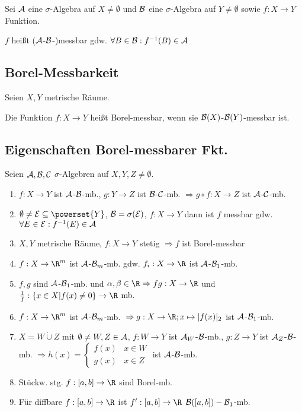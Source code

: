 Sei $\mathcal{A}$ eine $\sigma$-Algebra auf $X \neq \emptyset$ und $\mathcal{B}$ eine $\sigma$-Algebra auf $Y \neq \emptyset$ sowie $f : X \to Y$ Funktion.

$f$ heißt ($\mathcal{A}$-$\mathcal{B}$-)messbar gdw. $\forall B \in \mathcal{B} : f^{-1}(B) \in \mathcal{A}$

\subsection*{Borel-Messbarkeit}

Seien $X, Y$ metrische Räume.

Die Funktion $f : X \to Y$ heißt Borel-messbar, wenn sie $\mathcal{B}(X)$-$\mathcal{B}(Y)$-messbar ist.

\subsection*{Eigenschaften Borel-messbarer Fkt.}

Seien $\mathcal{A}, \mathcal{B}, \mathcal{C}$ $\sigma$-Algebren auf $X, Y, Z \neq \emptyset$.

\begin{enumerate}[label=(\alph*)]
	\item $f : X \to Y$ ist $\mathcal{A}$-$\mathcal{B}$-mb., $g : Y \to Z$ ist $\mathcal{B}$-$\mathcal{C}$-mb. $\Rightarrow g \circ f : X \to Z$ ist $\mathcal{A}$-$\mathcal{C}$-mb.
	\item $\emptyset \neq \E \subseteq \powerset{Y}$, $\mathcal{B} = \sigma(\mathcal{E})$, $f: X \to Y$ dann ist $f$ messbar gdw. $\forall E \in \mathcal{E} : f^{-1}(E) \in \mathcal{A}$
	\item $X, Y$ metrische Räume, $f : X \to Y$ stetig $\Rightarrow f$ ist Borel-messbar
	\item $f : X \to \R^m$ ist $\mathcal{A}$-$\mathcal{B}_m$-mb. gdw. $f_i : X \to \R$ ist $\mathcal{A}$-$\mathcal{B}_1$-mb.
	\item $f, g$ sind $\mathcal{A}$-$\mathcal{B}_1$-mb. und $\alpha, \beta \in \R \Rightarrow fg : X \to \R$ und $\frac{1}{f} : \{x \in X | f(x) \neq 0\} \to \R$ mb.
	\item $f : X \to \R^m$ ist $\mathcal{A}$-$\mathcal{B}_m$-mb. $\\\Rightarrow g : X \to \R; x \mapsto |f(x)|_2$ ist $\mathcal{A}$-$\mathcal{B}_1$-mb.
	\item{
		$X = W \dot\cup Z$ mit $\emptyset \neq W, Z \in \mathcal{A}$, $f : W \to Y$ ist $\mathcal{A}_W$-$\mathcal{B}$-mb., $g : Z \to Y$ ist $\mathcal{A}_Z$-$\mathcal{B}$-mb. $\Rightarrow h(x) = \begin{cases}
			f(x) & x \in W \\
			g(x) & x \in Z
		\end{cases}$ ist $\mathcal{A}$-$\mathcal{B}$-mb.
	}
	\item Stückw. stg. $f: [a,b] \to \R$ sind Borel-mb.
	\item Für diffbare $f : [a,b] \to \R$ ist $f' : [a,b] \to \R$ $\mathcal{B}([a,b])-\mathcal{B}_1$-mb.
\end{enumerate}

